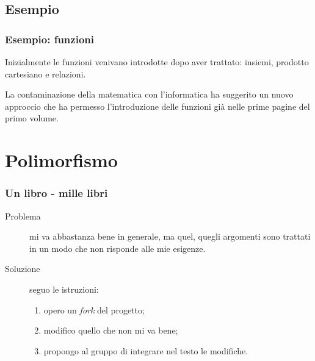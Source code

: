 \documentclass{beamer} %
\begin{document}
\subsection{Esempio} 

\begin{frame}\frametitle{Esempio: funzioni}

Inizialmente le funzioni venivano introdotte dopo aver 
trattato: insiemi, prodotto cartesiano e relazioni.

\pause
La contaminazione della matematica con l'informatica ha suggerito un nuovo 
approccio che ha permesso l'introduzione delle funzioni 
già nelle prime pagine del primo volume.

\medskip
{}

\end{frame}


\section{Polimorfismo}


\begin{frame}\frametitle{Un libro - mille libri}

\begin{description}
\item [Problema ] mi va abbastanza bene in generale, ma quel, quegli 
argomenti sono trattati in un modo che non risponde alle mie esigenze.
\item [Soluzione ] seguo le istruzioni:
\begin{enumerate} [<+->]
\item opero un \emph{fork} del progetto;
\item modifico quello che non mi va bene;
\item propongo al gruppo di integrare nel testo le modifiche.
\end{enumerate}
\end{description}

\end{frame}
\end{document}
